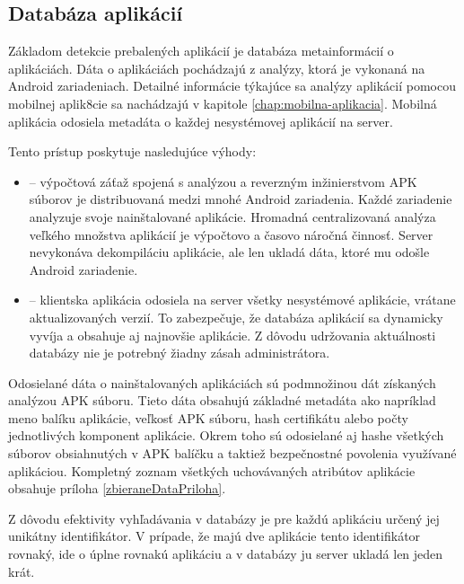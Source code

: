 \subsection{Databáza aplikácií}

Základom detekcie prebalených aplikácií je databáza metainformácií o aplikáciách. Dáta o aplikáciách pochádzajú z analýzy, ktorá je vykonaná na Android zariadeniach. Detailné informácie týkajúce sa analýzy aplikácií pomocou mobilnej aplik8cie  sa nachádzajú v kapitole \ref{chap:mobilna-aplikacia}. Mobilná aplikácia odosiela metadáta o každej nesystémovej aplikácií na server.

 
\noindent Tento prístup poskytuje nasledujúce výhody:
\begin{itemize}
	\item {} -- výpočtová záťaž spojená s analýzou a reverzným inžinierstvom APK súborov je distribuovaná medzi mnohé Android zariadenia. Každé zariadenie analyzuje svoje nainštalované aplikácie. Hromadná centralizovaná analýza veľkého množstva aplikácií je výpočtovo a časovo náročná činnosť. Server nevykonáva dekompiláciu aplikácie, ale len ukladá dáta, ktoré mu odošle Android zariadenie.
	\item {} -- klientska aplikácia odosiela na server všetky nesystémové aplikácie, vrátane aktualizovaných verzií. To zabezpečuje, že databáza aplikácií sa dynamicky vyvíja a obsahuje aj najnovšie aplikácie. Z dôvodu udržovania aktuálnosti databázy nie je potrebný žiadny zásah administrátora.
\end{itemize}

\noindent Odosielané dáta o nainštalovaných aplikáciách sú podmnožinou dát získaných analýzou APK súboru. Tieto dáta obsahujú základné metadáta ako napríklad meno balíku aplikácie, veľkosť APK súboru, hash certifikátu alebo počty jednotlivých komponent aplikácie. Okrem toho sú odosielané aj hashe všetkých  súborov obsiahnutých v APK balíčku a taktiež bezpečnostné povolenia využívané aplikáciou. Kompletný zoznam všetkých uchovávaných atribútov aplikácie obsahuje príloha \ref{zbieraneDataPriloha}.

Z dôvodu efektivity vyhľadávania v databázy je pre každú aplikáciu určený jej unikátny identifikátor. V prípade, že majú dve aplikácie tento identifikátor rovnaký, ide o úplne rovnakú aplikáciu a v databázy ju server ukladá len jeden krát.

